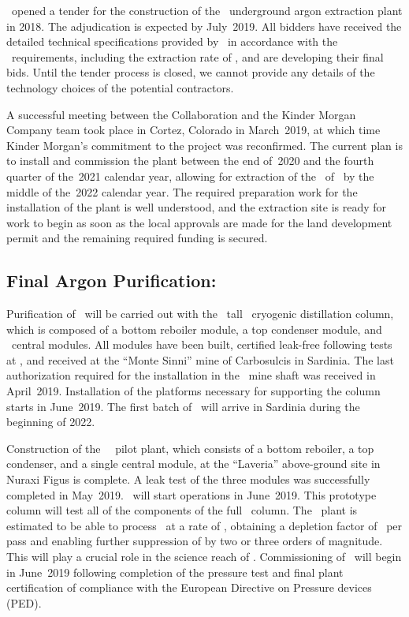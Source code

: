 \INFN\ opened a tender for the construction of the \Urania\ underground argon extraction plant in 2018.  The adjudication is expected by July~2019.  All bidders have received the detailed technical specifications provided by \INFN\ in accordance with the \GADMC\ requirements, including the extraction rate of \UraniaUArRate, and are developing their final bids. Until the tender process is closed, we cannot provide any details of the technology choices of the potential contractors.

A successful meeting between the Collaboration and the Kinder Morgan Company team took place in Cortez, Colorado in March~2019, at which time Kinder Morgan's commitment to the project was reconfirmed.  The current plan is to install and commission the plant between the end of~2020 and the fourth quarter of the~2021 calendar year, allowing for extraction of the \UraniaTotalDSkProduction\ of \UAr\ by the middle of the~2022 calendar year.  The required preparation work for the installation of the plant is well understood, and the extraction site is ready for work to begin as soon as the local approvals are made for the land development permit and the remaining required funding is secured.  


\subsection{Final Argon Purification: \Aria}
\label{sec:Aria}

Purification of \UAr\ will be carried out with the \AriaSeruciHeight\ tall \SeruciOne\ cryogenic distillation column, which is composed of a bottom reboiler module, a top condenser module, and \AriaCentralModulesNumber\ central modules.  
All modules have been built, certified leak-free following tests at \CERN, and received at the ``Monte Sinni'' mine of Carbosulcis in Sardinia.  
The last authorization required for the installation in the \Seruci\ mine shaft was received in April~2019.  
Installation of the platforms necessary for supporting the column starts in June~2019.  
The first batch of \UAr\ will arrive in Sardinia during the beginning of 2022.

Construction of the \AriaNuraxiHeight\ \SeruciZero\ pilot plant, which consists of a bottom reboiler, a top condenser, and a single central module, at the ``Laveria'' above-ground site in Nuraxi Figus is complete.  
A leak test of the three modules was successfully completed in May~2019.
\SeruciZero\ will start operations in June~2019.
This prototype column will test all of the components of the full \SeruciOne\ column.
The \SeruciOne\ plant is estimated to be able to process \UAr\ at a rate of \AriaSeruciOneRate, obtaining a  depletion factor of \AriaDepletionPerPass\ per pass and enabling further suppression of  by two or three orders of magnitude. 
This will play a crucial role in the science reach of \DSls. 
Commissioning of \SeruciZero\ will begin in June~2019 following completion of the pressure test and final plant certification of compliance with the European Directive on Pressure devices (PED).

